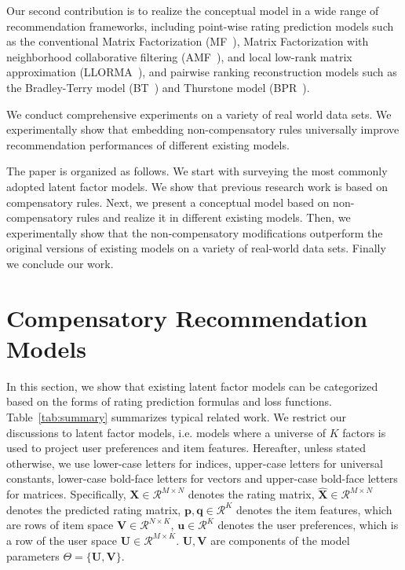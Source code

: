 \documentclass[letterpaper]{article} %
\newcommand{\Real}{\mathcal{R}}
\begin{document}
Our second contribution is to realize the conceptual model in a wide range of recommendation frameworks, including point-wise rating prediction models such as the conventional Matrix Factorization (MF~\cite{Koren2009Matrix}), Matrix Factorization with neighborhood collaborative filtering (AMF~\cite{Koren2008Factorization}), and local low-rank matrix approximation (LLORMA~\cite{Lee2013Local}), and pairwise ranking reconstruction models such as the Bradley-Terry model (BT~\cite{Hu2016Improved}) and Thurstone model (BPR~\cite{Rendle2009BPR}). 

We conduct comprehensive experiments on a variety of real world data sets. We experimentally show that embedding non-compensatory rules universally improve recommendation performances of different existing models. 

The paper is organized as follows. We start with surveying the most commonly adopted latent factor models. We show that previous research work is based on compensatory rules. Next, we present a conceptual model based on non-compensatory rules and realize it in different existing models. Then, we experimentally show that the non-compensatory modifications outperform the original versions of existing models on a variety of real-world data sets. Finally we conclude our work.

\section{Compensatory Recommendation Models}\label{sec:previousmodel}
In this section, we show that existing latent factor models can be categorized based on the forms of rating prediction formulas and loss functions. Table~\ref{tab:summary} summarizes typical related work. We restrict our discussions to latent factor models, i.e. models where a universe of $K$ factors is used to project  user preferences and item features. Hereafter, unless stated otherwise, we use lower-case letters for indices, upper-case letters for universal constants, lower-case bold-face letters for vectors and upper-case bold-face letters for matrices. Specifically, $\mathbf{X}\in \Real^{M\times N}$ denotes the rating matrix, $\hat{\mathbf{X}}\in \Real^{M\times N}$ denotes the predicted rating matrix,  $\mathbf{p},\mathbf{q}\in \Real^K$ denotes the item features, which are rows of item space $\mathbf{V}\in \Real^{N\times K}$, $\mathbf{u}\in \Real^K$ denotes the user preferences, which is a row of the user space $\mathbf{U}\in \Real^{M\times K}$.  $\mathbf{U},\mathbf{V}$ are components of the model parameters $\Theta=\{\mathbf{U},\mathbf{V} \}$.
\end{document}
